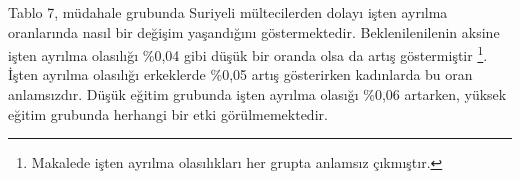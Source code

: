 \documentclass{article}
\begin{document}
\begin{justify}
\begin{table}[h]
\begin{tabular}{|ccccccc|}
                \end{tabular}
        \end{table}
        \FloatBarrier

        \newpage

        Tablo 7, müdahale grubunda Suriyeli mültecilerden dolayı işten ayrılma oranlarında nasıl bir 
        değişim yaşandığını göstermektedir. Beklenilenilenin aksine işten ayrılma olasılığı \%0,04 gibi düşük bir oranda 
        olsa da artış göstermiştir
        \footnote{Makalede işten ayrılma olasılıkları her grupta anlamsız çıkmıştır.}. 
        İşten ayrılma olasılığı erkeklerde \%0,05 artış gösterirken kadınlarda bu oran anlamsızdır.
        Düşük eğitim grubunda işten ayrılma olasığı \%0,06 artarken, yüksek eğitim grubunda herhangi bir etki görülmemektedir. 



\end{justify}
\end{document}
